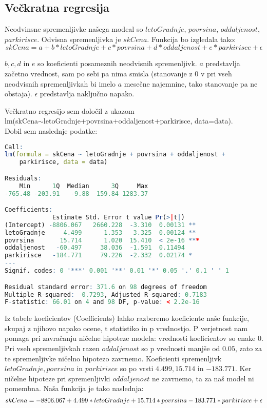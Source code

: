 \documentclass[a4paper, 12pt]{article}
\begin{document}
\subsection{Večkratna regresija}

Neodvinsne spremenljivke našega modeal so $ letoGradnje $, $ povrsina $,
$ oddaljenost $, $ parkirisce $. Odvisna spremenljivka je
$ skCena $. Funkcija bo izgledala tako:
\begin{equation}
	skCena = a+b*letoGradnje+c*povrsina+d*oddaljenost+e*parkirisce+\epsilon
\end{equation}

$ b, c, d $ in $ e $ so koeficienti posameznih neodvisnih spremenljivk. $ a $
predstavlja začetno vrednost, sam po sebi pa nima smisla (stanovanje z $ 0 $ v
pri vseh neodvisnih spremenljivkah bi imelo $ a $ mesečne najemnine, tako
stanovanje pa ne obstaja). $ \epsilon $ predstavlja naključno napako.

Večkratno regresijo sem določil z ukazom \\
{\sf lm(skCena$\sim$letoGradnje+povrsina+oddaljenost+parkirisce, data=data)}. \\
Dobil sem naslednje podatke:
\begin{lstlisting}[language=R,basicstyle=\small]
Call:
lm(formula = skCena ~ letoGradnje + povrsina + oddaljenost +
    parkirisce, data = data)

Residuals:
    Min      1Q  Median      3Q     Max
-765.48 -203.91   -9.88  159.84 1283.37

Coefficients:
             Estimate Std. Error t value Pr(>|t|)
(Intercept) -8806.067   2660.228  -3.310  0.00131 **
letoGradnje     4.499      1.353   3.325  0.00124 **
povrsina       15.714      1.020  15.410  < 2e-16 ***
oddaljenost   -60.497     38.036  -1.591  0.11494
parkirisce   -184.771     79.226  -2.332  0.02174 *
---
Signif. codes: 0 '***' 0.001 '**' 0.01 '*' 0.05 '.' 0.1 ' ' 1

Residual standard error: 371.6 on 98 degrees of freedom
Multiple R-squared:  0.7293, Adjusted R-squared: 0.7183
F-statistic: 66.01 on 4 and 98 DF, p-value: < 2.2e-16
\end{lstlisting}

Iz tabele koeficientov (Coefficients) lahko razberemo koeficiente naše
funkcije, skupaj z njihovo napako ocene, t statistiko in p vrednostjo. P
verjetnost nam pomaga pri zavračanju ničelne hipoteze modela: vrednosti
koeficientov so enake $ 0 $. Pri vseh spremenljivkah razen $ oddaljenost $ so
p vrednosti manjše od $ 0.05 $, zato za te spremenljivke ničelno hipotezo
zavrnemo. Koeficienti spremenljivk $ letoGradnje, povrsina $ in $ parkirisce $
so po vrsti $ 4.499, 15.714 $ in $ -183.771 $. Ker ničelne hipoteze pri
spremenljivki $ oddaljenost $ ne zavrnemo, ta za naš model ni pomembna. Naša
funkcija je tako naslednja:
\begin{equation}
	skCena = -8806.067+4.499*letoGradnje \newline +15.714*povrsina-183.771*parkirisce+\epsilon
\end{equation}
\end{document}
